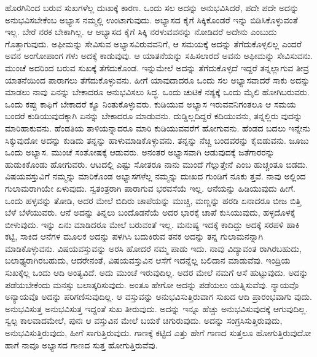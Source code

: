 ಹೊರಗಿನಿಂದ ಬರುವ ಸುಖಗಳೆಲ್ಲ ದುಃಖಕ್ಕೆ ಕಾರಣ. ಒಂದು ಸಲ ಅದನ್ನು ಅನುಭವಿಸಿದರೆ, ಪದೇ ಪದೇ ಅದನ್ನು ಅನುಭವಿಸಬೇಕೆಂಬ ಅಭ್ಯಾಸ ನಮ್ಮಲ್ಲಿ ಉಂಟಾಗುವುದು. ಅಭ್ಯಾಸದ ಕೈಗೆ ಸಿಕ್ಕಿಕೊಂಡರೆ ಇನ್ನು ಬಿಡಿಸಿಕೊಳ್ಳುವಂತೆ ಇಲ್ಲ. ಬೇರೆ ನರಕ ಬೇಕಾಗಿಲ್ಲ. ಆ ಅಭ್ಯಾಸದ ಕೈಗೆ ಸಿಕ್ಕಿ ನರಳುವವನನ್ನು ನೋಡಿದರೆ ಅದೇನು ಎಂಬುದು ಗೊತ್ತಾಗುವುದು. ಅಫೀಮನ್ನು ಸೇವಿಸುವ ಅಭ್ಯಾಸವಿರುವವನಿಗೆ, ಆ ಸಮಯಕ್ಕೆ ಅದನ್ನು ತೆಗೆದುಕೊಳ್ಳಲಿಲ್ಲ ಎಂದರೆ ಅವನ ಅಂಗೋಪಾಂಗ ಗಳು ಅದಕ್ಕೆ ಕಾಡುವುವು. ಆ ಯಾತನೆಯನ್ನು ಸಹಿಸಲಾರದೆ ಅವನು ಅಫೀಮನ್ನು ಸೇವಿಸುವನು. ಮುಂಚೆ ಅದರಿಂದ ಬರುವ ಸುಖಕ್ಕೆ ತೆಗೆದುಕೊಂಡ. ಇನ್ನುಮೇಲೆ ಅದನ್ನು ತೆಗೆದುಕೊಳ್ಳದೆ ಇದ್ದರೆ ತನ್ನಲ್ಲಾಗುವ ತೀವ್ರ ಯಾತನೆಯಿಂದ ಪಾರಾಗಲು ತೆಗೆದುಕೊಳ್ಳುವನು. ಹೀಗೆ ಯಾವುದಾದರೂ ಒಂದು ಸಲ ಅಭ್ಯಾಸವಾದರೆ ಸಾಕು ಅದನ್ನು ಮಾಡಲು ನಾವು ಏನನ್ನು ಬೇಕಾದರೂ ಅನುಭವಿಸಲು ಸಿದ್ಧ. ಒಂದು ಚುಟಿಕೆ ನಶ್ಯಕ್ಕೆ ಒಂದು ಮೈಲಿ ಹೋಗಿಬರುವರು. ಒಂದು ಕಪ್ಪು ಕಾಫಿಗೆ ಬೇಕಾದರೆ ಕ್ಯೂ ನಿಂತುಕೊಳ್ಳುವರು. ಕುಡಿಯುವ ಅಭ್ಯಾಸ ಇರುವವನಿಗಂತಲೂ ಆ ಸಮಯ ಬಂದರೆ ಕುಡಿಯುವುದಕ್ಕಾಗಿ ಏನನ್ನು ಬೇಕಾದರೂ ಮಾಡುವನು. ದುಡ್ಡಿಲ್ಲದಿದ್ದರೆ ಕದಿಯುವನು, ತನ್ನಲ್ಲಿರು ವುದನ್ನು ಮಾರಿಹಾಕುವನು. ಹೆಂಡತಿಯ ತಾಳಿಯನ್ನಾದರೂ ಮಾರಿ ಕುಡಿಯುವವರೆಗೆ ಹೋಗುವನು. ಹೆಂಡದ ಬದಲು ಇನ್ನೇನು ಸಿಕ್ಕುವುದೋ ಅದನ್ನು ಕುಡಿದು ತನ್ನನ್ನು ಹಾಳುಮಾಡಿಕೊಳ್ಳುವನು. ತನ್ನನ್ನು ನೆಚ್ಚಿ ಬಂದವರನ್ನು ಕೈಬಿಡುವನು. ಜೂಜು ಒಂದು ಅಭ್ಯಾಸ. ಮುಂಚೆ ಸಂತೋಷಕ್ಕೆ ಆಡುವರು. ಅನಂತರ ಅಭ್ಯಾಸವಾಗಿ ಆಡುವುದಕ್ಕೆ ಜತೆಗಾರರನ್ನು ಹುಡುಕಿಕೊಂಡು ಹೋಗುವರು. ಆಟದಲ್ಲಿ ಎಷ್ಟು ಸೋತರೂ ನಾನು ಮುಂದೆ ಗೆಲ್ಲುತ್ತೇನೆ ಎಂಬ ಹುಚ್ಚಂತೂ ಬಿಡದು. ವಿಷಯವಸ್ತುವಿಗೆ ನಮ್ಮನ್ನು ಮಾರಿಕೊಂಡ ಅಭ್ಯಾಸಗಳೆಲ್ಲ ನಮ್ಮನ್ನು ದುಃಖದ ಗುಂಡಿಗೆ ನೂಕು ತ್ತವೆ. ನಾವು ಅಲ್ಲಿಂದ ಗುಲಾಮರಾಗಿಯೇ ಏಳುವುದು. ಸ್ವತಂತ್ರರಾಗಿ ಪಾರಾಗುವ ಭರವಸೆಯೆ ಇಲ್ಲ. ಆನೆಯನ್ನು ಹಿಡಿಯುವುದು ಹೀಗೆ. ಒಂದು ಹಳ್ಳವನ್ನು ತೋಡಿ, ಅದರ ಮೇಲೆ ಬಿದಿರು ಚಾಪೆಯನ್ನು ಮುಚ್ಚಿ, ಮಣ್ಣನ್ನು ಹರಡಿ ಏನಾದರೂ ಬೀಜ ಬಿತ್ತಿ ಬೆಳೆ ಬೆಳೆಯುವರು. ಆನೆ ಅದನ್ನು ತಿನ್ನಲು ಬಂದೊಡನೆಯೆ ಅದರ ಭಾರಕ್ಕೆ ಚಾಪೆ ಕುಸಿಯುವುದು, ಹಳ್ಳದೊಳಕ್ಕೆ ಬೀಳುವುದು. ಇನ್ನು ಏನು ಮಾಡಿದರೂ ಮೇಲೆ ಬರುವಂತೆ ಇಲ್ಲ. ಮನುಷ್ಯ ಇದಕ್ಕೆ ಕಾದಿದ್ದು ಅದಕ್ಕೆ ಸರಪಳಿ ಹಾಕಿ ಕಟ್ಟಿ, ಸಾಕಿದ ಆನೆಗಳ ಮೂಲಕ ಅದನ್ನು ಪಳಗಿಸಿ ಬದುಕಿರುವ ತನಕ ಅದನ್ನು ತನ್ನ ಗುಲಾಮನನ್ನಾಗಿ ಮಾಡಿಕೊಳ್ಳುವನು. ವಿಷಯವಸ್ತುವನ್ನು ಅರಸಿ ಹೋದರೆ ನಮ್ಮ ಪಾಡು ಇದು. ನಾವು ವಿದ್ಯಾವಂತ ರಾಗಿರಬಹುದು, ಬಲಾಢ್ಯರಾಗಿರಬಹುದು, ಆದರೇನಂತೆ, ವಿಷಯವಸ್ತುವಿನ ಆಸೆಗೆ ಇದನ್ನೆಲ್ಲ ಬಲಿದಾನ ಮಾಡುವೆವು. ಇಂದ್ರಿಯ ಸುಖಕ್ಕೆಲ್ಲ ಒಂದು ಆದಿ ಅಂತ್ಯವಿದೆ. ಅದು ಮುಂಚೆ ಇರುವುದಿಲ್ಲ. ಅದರ ಮೇಲೆ ನಮಗೆ ಆಸೆ ಹುಟ್ಟುವುದು. ಅದನ್ನು ಪಡೆಯಬೇಕೆಂದು ಮನಸ್ಸು ಬಲಾತ್ಕರಿಸುವುದು. ಅಂತೂ ಹೇಗೋ ಅದನ್ನು ಪಡೆಯಲು ಯತ್ನಿಸುವೆವು. ನ್ಯಾಯವೊ ಅನ್ಯಾಯವೊ ಅದನ್ನು ಪರಿಗಣಿಸುವುದಿಲ್ಲ. ಆ ವಸ್ತುವನ್ನು ಅನುಭವಿಸುತ್ತಿರುವಾಗ ಸುಖದ ಆದಿ ಪ್ರಾರಂಭವಾಗು ವುದು. ಅನುಭವಿಸುತ್ತ ಅನುಭವಿಸುತ್ತ ಇದ್ದಂತೆ ಸುಖ ತೀರುವುದು. ಅದನ್ನು ಇನ್ನೂ ಹೆಚ್ಚು ಅನುಭವಿಸುವುದಕ್ಕೆ ಆಗುವುದಿಲ್ಲ. ಸ್ವಲ್ಪ ಕಾಲವಾದಮೇಲೆ, ಪುನಃ ಆ ವಸ್ತುವಿನ ಮೇಲೆ ಬಯಕೆ ಚಿಗುರುವುದು. ಅದನ್ನು ಸಂಗ್ರಸಿಸುತ್ತಿರುವುದು, ಅನುಭವಿಸುತ್ತಿರುವುದು, ಹೀಗೆ ಸಾಗುತ್ತಿರುವುದು. ಗಾಣಕ್ಕೆ ಕಟ್ಟಿದ ಎತ್ತು ಹೇಗೆ ಗಾಣದ ಸುತ್ತಲೂ ಹೋಗುತ್ತಿರುವುದೋ ಹಾಗೆ ನಾವೂ ಅಭ್ಯಾಸದ ಗಾಣದ ಸುತ್ತ ಹೋಗುತ್ತಿರುವೆವು.

